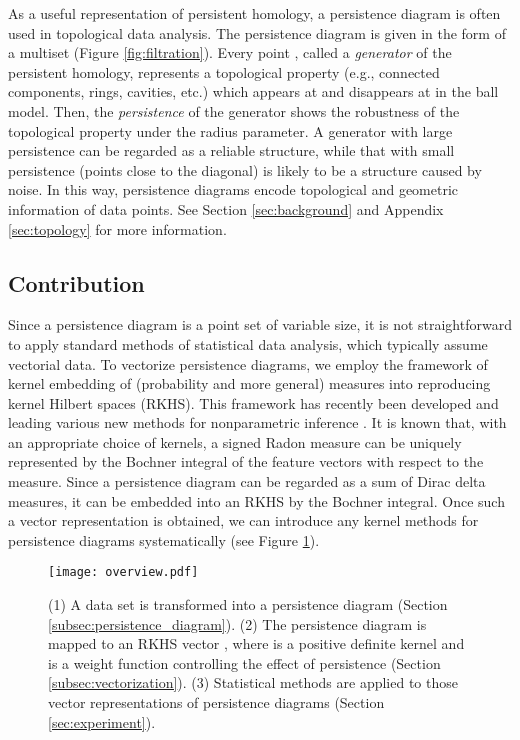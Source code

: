 \documentclass{article}
\begin{document}
As a useful representation of persistent homology, a persistence diagram is often used in topological data analysis.
The persistence diagram is given in the form of a multiset  (Figure \ref{fig:filtration}).
Every point , called a {\em generator} of the persistent homology, represents a topological property (e.g., connected components, rings, cavities, etc.) which appears at  and disappears at  in the ball model.
Then, the {\em persistence}  of the generator shows the robustness of the topological property under the radius parameter.
A generator with large persistence can be regarded as a reliable structure, while that with small persistence (points close to the diagonal) is likely to be a structure caused by noise.
In this way, persistence diagrams encode topological and geometric information of data points.
See Section \ref{sec:background} and Appendix \ref{sec:topology} for more information.

\subsection{Contribution}
\label{subsec:contribution}

Since a persistence diagram is a point set of variable size, it is not straightforward to apply standard methods of statistical data analysis, which typically assume vectorial data.
To vectorize persistence diagrams, we employ the framework of kernel embedding of (probability and more general) measures into reproducing kernel Hilbert spaces (RKHS).
This framework has recently been developed and leading various new methods for nonparametric inference \cite{MFSS17,SGSS07,SFG13}.
It is known \cite{SFL11} that, with an appropriate choice of kernels, a signed Radon measure can be uniquely represented by the Bochner integral of the feature vectors with respect to the measure.
Since a persistence diagram can be regarded as a sum of Dirac delta measures, it can be embedded into an RKHS by the Bochner integral.
Once such a vector representation is obtained, we can introduce any kernel methods for persistence diagrams systematically (see Figure \ref{fig:overview}). 
\begin{figure}[htbp]
\begin{center}
\texttt{[image: overview.pdf]}
\caption{
(1) A data set  is transformed into a persistence diagram  (Section \ref{subsec:persistence_diagram}).
(2) The persistence diagram  is mapped to an RKHS vector , where  is a positive definite kernel and  is a weight function controlling the effect of persistence (Section \ref{subsec:vectorization}).
(3) Statistical methods are applied to those vector representations of  persistence diagrams (Section \ref{sec:experiment}).}
\label{fig:overview}
\end{center}
\end{figure}
\end{document}
